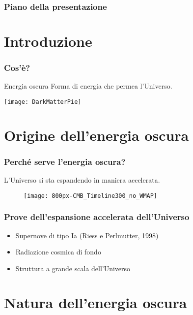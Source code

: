\begin{frame}
  \maketitle
\end{frame}

\begin{frame}
  \frametitle{Piano della presentazione}
  \tableofcontents
\end{frame}

\section{Introduzione}

\begin{frame}
  \frametitle{Cos'è?}
  \begin{block}{Energia oscura}
    Forma di energia che permea l'Universo.
  \end{block}
  \texttt{[image: DarkMatterPie]}
\end{frame}

\section[Origine]{Origine dell'energia oscura}

\begin{frame}
  \frametitle{Perché serve l'energia oscura?}
  L'Universo si sta espandendo in maniera \alert{accelerata}.
  \begin{figure}
    \centering
    \texttt{[image: 800px-CMB\_Timeline300\_no\_WMAP]}
  \end{figure}
\end{frame}

\begin{frame}
  \frametitle{Prove dell'espansione accelerata dell'Universo}
  \begin{itemize}[<+->]
  \item Supernove di tipo Ia (Riess e Perlmutter, 1998)
  \item Radiazione cosmica di fondo
  \item Struttura a grande scala dell'Universo
  \end{itemize}
\end{frame}

\section[Natura]{Natura dell'energia oscura}

